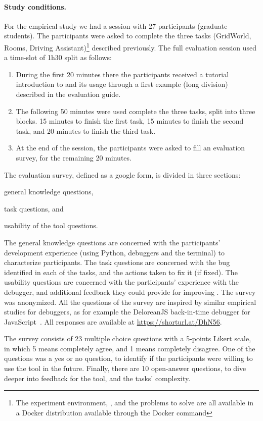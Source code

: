 \paragraph{\textbf{Study conditions.}}
For the empirical study we had a session with 27 participants (\ie graduate students). 
The participants were asked to complete the three tasks (\ie GridWorld, Rooms, Driving Assistant)\footnote{The experiment environment, \flik, and the problems to solve are all available in a Docker distribution available through the Docker command } 
described previously. The full evaluation session used a time-slot of 1h30 split as follows: 
\begin{enumerate}[label=\textbf{\arabic*.}]
  \item During the first 20 minutes there the participants received a tutorial introduction to \flik and its 
  usage through a first example (long division) described in the evaluation guide.
  \item The following 50 minutes were used complete the three tasks, split into three blocks. 15 minutes 
  to finish the first task, 15 minutes to finish the second task, and  20 minutes to finish the third task. 
  \item At the end of the session, the participants were asked to fill an evaluation survey, for the 
  remaining 20 minutes. 
\end{enumerate}

The evaluation survey, defined as a google form, is divided in three sections: 
\begin{enumerate*}[label=(\arabic*)]
\item general knowledge questions, 
\item task questions, and 
\item usability of the tool questions.
\end{enumerate*}
The general knowledge questions are concerned with the participants' development experience 
(\ie using Python, debuggers and the terminal) to characterize participants. The task questions are 
concerned with the bug identified in each of the tasks, and the actions taken to fix it (if fixed). The 
usability questions are concerned with the participants' experience with the debugger, and additional 
feedback they could provide for improving \flik. The survey was anonymized. All the questions of the 
survey are inspired by similar empirical studies for debuggers, as for example the DeloreanJS 
back-in-time debugger for JavaScript~\cite{leger23}. All responses are available 
at \url{https://shorturl.at/DhN56}. 

The survey consists of 23 multiple choice questions with a 5-points Likert scale, in which 5 means 
completely agree, and 1 means completely disagree. One of the questions was a yes or no question, 
to identify if the participants were willing to use the tool in the future. Finally, there are 10 open-answer 
questions, to dive deeper into feedback for the tool, and the tasks' complexity.


\endinput

